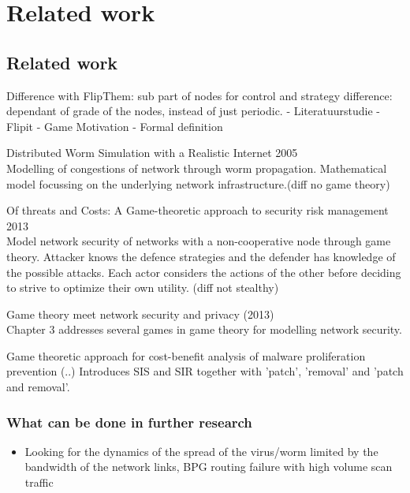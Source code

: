 \chapter{Related work}
\label{cha:1}



\section{Related work}

Difference with FlipThem: sub part of nodes for control and strategy difference: dependant of grade of the nodes, instead of just periodic.
- Literatuurstudie
- Flipit
- Game Motivation
- Formal definition






\begin{description}
\item Distributed Worm Simulation with a Realistic Internet 2005  \\
Modelling of congestions of network through worm propagation. Mathematical model focussing on the underlying network infrastructure.(diff no game theory) 
\item Of threats and Costs: A Game-theoretic approach to security risk management 2013\\
Model network security of networks with a non-cooperative node through game theory. Attacker knows the defence strategies and the defender has knowledge of the possible attacks. Each actor considers the actions of the other before deciding to strive to optimize their own utility. (diff not stealthy)
\item Game theory meet network security and privacy (2013) \\
Chapter 3 addresses several games in game theory for modelling network security.
\item Game theoretic approach for cost-benefit analysis of malware proliferation prevention (..)
Introduces SIS and SIR together with 'patch', 'removal' and 'patch and removal'.
\end{description}

\subsection{What can be done in further research}
\begin{itemize}
\item Looking for the dynamics of the spread of the virus/worm limited by the bandwidth of the network links, BPG routing failure with high volume scan traffic
\end{itemize}
